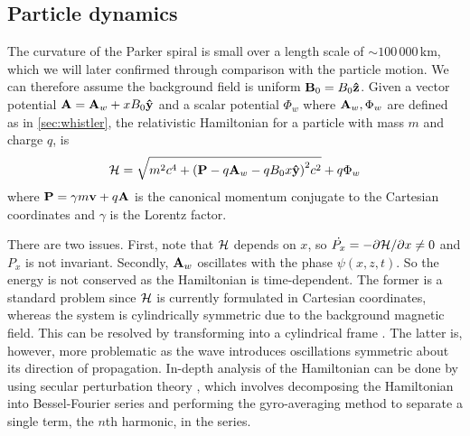 \subsection{Particle dynamics}\label{sec:particle_dynamics}

The curvature of the Parker spiral is small over a length scale of
$\sim100\,000\,$\si{km}, which we will later confirmed through comparison with
the particle motion. We can therefore assume the background field is uniform
$\vb{B}_0=B_0\vb{\hat{z}}$. Given a vector potential $\vb{A}=\vb{A}_w+xB_0\vb{\hat{y}}$ and a scalar potential $\Phi_w$ where $\vb{A}_w,\Phi_w$ are defined as in \cref{sec:whistler}, the relativistic Hamiltonian for a particle with mass $m$ and charge $q$, is
 \begin{equation}\label{eq:relativistic_hamiltonian}
    \mathcal{H}=\sqrt{m^2c^4+\qty(\vb{P}-q\vb{A}_w-qB_0x\vb{\hat{y}})^2c^2}+q\Phi_w
 \end{equation}
 where $\vb{P}=\gamma m\vb{v}+q\vb{A}$ is the canonical momentum conjugate to
 the Cartesian coordinates and $\gamma$ is the Lorentz factor.

 There are two issues. First, note that $\mathcal{H}$ depends on $x$, so
 $\dot{P_x}=-\partial\mathcal{H}/\partial x\neq0$ and $P_x$ is not invariant. Secondly,
 $\vb{A}_w$ oscillates with the phase $\psi(x,z,t)$. So the energy is not
 conserved as the Hamiltonian is time-dependent. The former is a standard
 problem since $\mathcal{H}$ is currently formulated in Cartesian coordinates, whereas
 the system is cylindrically symmetric due to the background magnetic field.
 This can be resolved by transforming into a cylindrical frame
 \citep{Goldstein2002}. The latter is, however, more problematic as the wave
 introduces oscillations symmetric about its direction of propagation. In-depth
 analysis of the Hamiltonian can be done by using secular perturbation theory
 \citep{Lichtenberg&Lieberman1992}, which involves decomposing the Hamiltonian into Bessel-Fourier series and performing the gyro-averaging method to separate a single term, the $n$th harmonic, in the series.


